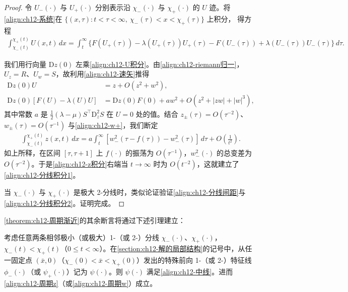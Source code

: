 \documentclass[../../main.tex]{subfiles}
\begin{document}
\begin{proof}
令 $U_-(\cdot)$ 与 $U_+(\cdot)$ 分别表示沿 $\chi_-(\cdot)$ 与 $\chi_+(\cdot)$ 的 $U$ 迹。将\eqref{align:ch12-系统}在 $\{(x,\tau):t<\tau<\infty,\ \chi_-(\tau)<x<\chi_+(\tau)\}$ 上积分，
得方程
\begin{align}
\int_{\chi_-(t)}^{\chi_+(t)}U(x,t)\,dx
=\int_t^\infty\{F(U_+(\tau))-\lambda(U_+(\tau))U_+(\tau)-F(U_-(\tau))+\lambda(U_-(\tau))U_-(\tau)\}\,d\tau.
\label{align:ch12-U积分}
\end{align}

我们用行向量 $\mathrm{D}z(0)$ 左乘\eqref{align:ch12-U积分}。由\eqref{align:ch12-riemann归一}，
$U_z=R$、$U_w=S$，故利用\eqref{align:ch12-速矢}推得
\begin{align}
\mathrm{D}z(0)U&=z+O(z^2+w^2),
\label{align:ch12-DzU}\\
\mathrm{D}z(0)[F(U)-\lambda(U)U]&=\mathrm{D}z(0)F(0)+aw^2+O(z^2+|zw|+|w|^3),
\label{align:ch12-DzF}
\end{align}
其中常数 $a$ 是 $\frac12(\lambda-\mu)S^\top\mathrm{D}^2_{z}S$ 在 $U=0$ 处的值。结合 $z_\pm(\tau)=O(\tau^{-2})$、$w_\pm(\tau)=O(\tau^{-1})$ 与\eqref{align:ch12-w+}，我们断定
\begin{align}
\int_{\chi_-(t)}^{\chi_+(t)}z(x,t)\,dx=a\int_t^\infty[w_-^2(\tau-f(\tau))-w_-^2(\tau)]\,d\tau+O\left(\frac1{t^2}\right).
\label{align:ch12-z积分-s10}
\end{align}
如上所释，在区间 $[\tau,\tau+1]$ 上 $f(\cdot)$ 的振荡为 $O(\tau^{-1})$，$w_-^2(\cdot)$ 的总变差为 $O(\tau^{-2})$。于是\eqref{align:ch12-z积分}右端当 $t\to\infty$ 时为 $O(t^{-2})$，这就建立了\eqref{align:ch12-分线积分1}。

当 $\chi_-(\cdot)$ 与 $\chi_+(\cdot)$ 是极大 2-分线时，类似论证验证\eqref{align:ch12-分线间距}与\eqref{align:ch12-分线积分2}。证明完成。
\end{proof}

\cref{theorem:ch12-周期渐近}的其余断言将通过下述引理建立：

\begin{lemma}\label{lemma:ch12-中线}
考虑任意两条相邻极小（或极大）1-（或 2-）分线 $\chi_-(\cdot)$、$\chi_+(\cdot)$，$\chi_-(t)<\chi_+(t)$（$0\leqslant t<\infty$）。在\cref{section:ch12-解的局部结构}的记号中，从任一固定点 $(\bar x,0)$（$\chi_-(0)<\bar x<\chi_+(0)$）发出的特殊前向 1-（或 2-）特征线 $\phi_-(\cdot)$（或 $\psi_+(\cdot)$）记为 $\psi(\cdot)$。则 $\psi(\cdot)$ 满足\eqref{align:ch12-中线}。进而\eqref{align:ch12-周期z}（或\eqref{align:ch12-周期w}）成立。
\end{lemma}
\end{document}
